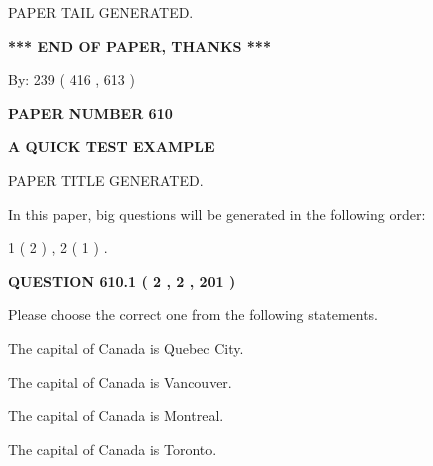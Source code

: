 \documentclass[12pt]{article}
\begin{document}
   
   
   
   
   
 \vspace{0.2in}
 
   
   
\vspace{2.0in} PAPER TAIL GENERATED.
   
   
   
   
\vspace{1.0in} 
{\textbf{\large{ *** END OF PAPER, THANKS *** }}} 
   
   
\hspace{1.0in} By: 
 239 ( 416 ,  613 )
   
   
   
   
\newpage 
\setcounter{page}{ 
   610001 } 
   
   
   
   
 {\textbf{ \Large{ PAPER NUMBER  610  }}}
   
   
\vspace{0.2in}
   
   
   
   
   
   
   
   
 \vspace{0.2in}
{\LARGE {\textbf{ A QUICK TEST EXAMPLE}}}
   
   
 PAPER TITLE GENERATED.
   
   
   
\vspace{0.2in}
   
In this paper, big questions will be generated in the following order: 
   
   
   1 ( 2 )
 ,
   2 ( 1 )
 .
  
\vspace{0.2in}
  
{\textbf{\Large{QUESTION
610.1 
 ( 2 , 2 , 201 )
}}}
  
  
Please choose the correct one from the following statements.
 
 
The capital of Canada is Quebec City.
 
 
The capital of Canada is Vancouver.
 
 
The capital of Canada is Montreal.
 
 
The capital of Canada is Toronto.
 
\end{document}
